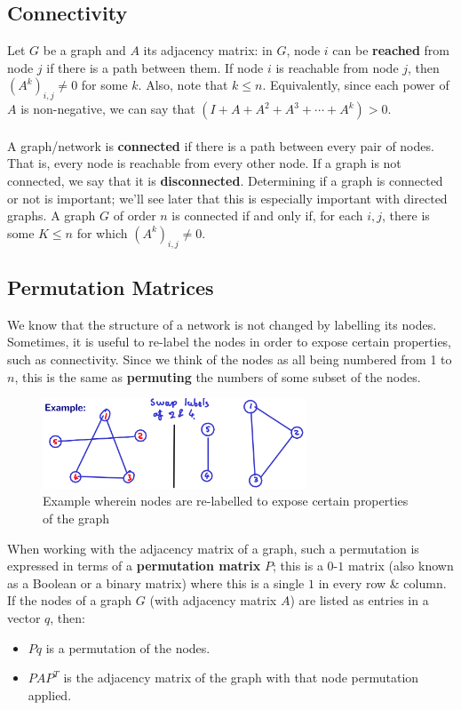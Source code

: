 \documentclass[a4paper,11pt]{article}
\begin{document}
\subsection{Connectivity}
Let $G$ be a graph and $A$ its adjacency matrix:
in $G$, node $i$ can be \textbf{reached} from node $j$ if there is a path between them.
If node $i$ is reachable from node $j$, then $(A^k)_{i,j} \neq 0$ for some $k$.
Also, note that $k \leq n$.
Equivalently, since each power of $A$ is non-negative, we can say that $(I + A + A^2 + A^3 + \cdots + A^k) > 0$.
\\\\
A graph/network is \textbf{connected} if there is a path between every pair of nodes.
That is, every node is reachable from every other node.
If a graph is not connected, we say that it is \textbf{disconnected}.
Determining if a graph is connected or not is important; we'll see later that this is especially important with directed graphs.
A graph $G$ of order $n$ is connected if and only if, for each $i,j$, there is some $K \leq n$ for which $(A^k)_{i,j} \neq 0$.

\subsection{Permutation Matrices}
We know that the structure of a network is not changed by labelling its nodes.
Sometimes, it is useful to re-label the nodes in order to expose certain properties, such as connectivity.
Since we think of the nodes as all being numbered from 1 to $n$, this is the same as \textbf{permuting} the numbers of some subset of the nodes.

\begin{figure}[H]
    \centering
    \includegraphics[width=0.7\textwidth]{./images/permexampe.png}
    \caption{ Example wherein nodes are re-labelled to expose certain properties of the graph }
\end{figure}

When working with the adjacency matrix of a graph, such a permutation is expressed in terms of a \textbf{permutation matrix} $P$;
this is a $0$-$1$ matrix (also known as a Boolean or a binary matrix) where this is a single $1$ in every row \& column.
If the nodes of a graph $G$ (with adjacency matrix $A$) are listed as entries in a vector ${q}$, then:
\begin{itemize}
    \item   $Pq$ is a permutation of the nodes.
    \item   $PAP^T$ is the adjacency matrix of the graph with that node permutation applied.
\end{itemize}
\end{document}
